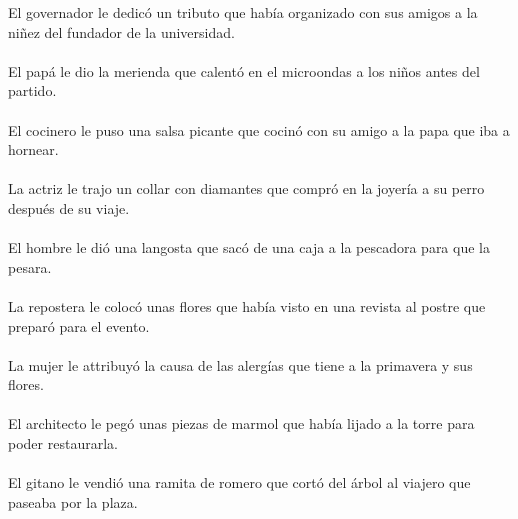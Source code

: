 El governador le dedic\'{o} un tributo que hab\'{i}a organizado con sus amigos a la ni\~{n}ez del fundador de la universidad.	\\	\\
El pap\'{a} le dio la merienda que calent\'{o} en el microondas a los ni\~{n}os antes del partido.	\\	\\
El cocinero le puso una salsa picante que cocin\'{o} con su amigo a la papa que iba a hornear.	\\	\\
La actriz le trajo un collar con diamantes que compr\'{o} en la joyer\'{i}a a su perro despu\'{e}s de su viaje.	\\	\\
El hombre le di\'{o} una langosta que sac\'{o} de una caja a la pescadora para que la pesara.	\\	\\
La repostera le coloc\'{o} unas flores que hab\'{i}a visto en una revista al postre que prepar\'{o} para el evento.	\\	\\
La mujer le attribuy\'{o} la causa de las alerg\'{i}as que tiene a la primavera y sus flores.	\\	\\
El architecto le peg\'{o} unas piezas de marmol que hab\'{i}a lijado a la torre para poder restaurarla.	\\	\\
El gitano le vendi\'{o} una ramita de romero que cort\'{o} del \'{a}rbol al viajero que paseaba por la plaza.

